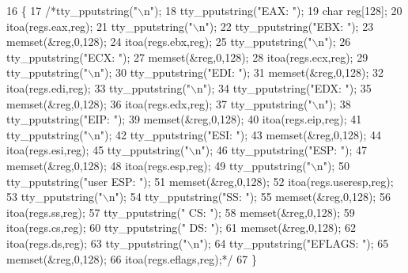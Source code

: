 \begin{DoxyCode}
16                              \{
17     \textcolor{comment}{/*tty\_pputstring("\(\backslash\)n");}
18 \textcolor{comment}{    tty\_pputstring("EAX: ");}
19 \textcolor{comment}{    char reg[128];}
20 \textcolor{comment}{    itoa(regs.eax,reg);}
21 \textcolor{comment}{    tty\_pputstring("\(\backslash\)n");}
22 \textcolor{comment}{    tty\_pputstring("EBX: ");}
23 \textcolor{comment}{    memset(&reg,0,128);}
24 \textcolor{comment}{    itoa(regs.ebx,reg);}
25 \textcolor{comment}{    tty\_pputstring("\(\backslash\)n");}
26 \textcolor{comment}{    tty\_pputstring("ECX: ");}
27 \textcolor{comment}{    memset(&reg,0,128);}
28 \textcolor{comment}{    itoa(regs.ecx,reg);}
29 \textcolor{comment}{    tty\_pputstring("\(\backslash\)n");}
30 \textcolor{comment}{    tty\_pputstring("EDI: ");}
31 \textcolor{comment}{    memset(&reg,0,128);}
32 \textcolor{comment}{    itoa(regs.edi,reg);}
33 \textcolor{comment}{    tty\_pputstring("\(\backslash\)n");}
34 \textcolor{comment}{    tty\_pputstring("EDX: ");}
35 \textcolor{comment}{    memset(&reg,0,128);}
36 \textcolor{comment}{    itoa(regs.edx,reg);}
37 \textcolor{comment}{    tty\_pputstring("\(\backslash\)n");}
38 \textcolor{comment}{    tty\_pputstring("EIP: ");}
39 \textcolor{comment}{    memset(&reg,0,128);}
40 \textcolor{comment}{    itoa(regs.eip,reg);}
41 \textcolor{comment}{    tty\_pputstring("\(\backslash\)n");}
42 \textcolor{comment}{    tty\_pputstring("ESI: ");}
43 \textcolor{comment}{    memset(&reg,0,128);}
44 \textcolor{comment}{    itoa(regs.esi,reg);}
45 \textcolor{comment}{    tty\_pputstring("\(\backslash\)n");}
46 \textcolor{comment}{    tty\_pputstring("ESP: ");}
47 \textcolor{comment}{    memset(&reg,0,128);}
48 \textcolor{comment}{    itoa(regs.esp,reg);}
49 \textcolor{comment}{    tty\_pputstring("\(\backslash\)n");}
50 \textcolor{comment}{    tty\_pputstring("user ESP: ");}
51 \textcolor{comment}{    memset(&reg,0,128);}
52 \textcolor{comment}{    itoa(regs.useresp,reg);}
53 \textcolor{comment}{    tty\_pputstring("\(\backslash\)n");}
54 \textcolor{comment}{    tty\_pputstring("SS: ");}
55 \textcolor{comment}{    memset(&reg,0,128);}
56 \textcolor{comment}{    itoa(regs.ss,reg);}
57 \textcolor{comment}{    tty\_pputstring(" CS: ");}
58 \textcolor{comment}{    memset(&reg,0,128);}
59 \textcolor{comment}{    itoa(regs.cs,reg);}
60 \textcolor{comment}{    tty\_pputstring(" DS: ");}
61 \textcolor{comment}{    memset(&reg,0,128);}
62 \textcolor{comment}{    itoa(regs.ds,reg);}
63 \textcolor{comment}{    tty\_pputstring("\(\backslash\)n");}
64 \textcolor{comment}{    tty\_pputstring("EFLAGS: ");}
65 \textcolor{comment}{    memset(&reg,0,128);}
66 \textcolor{comment}{    itoa(regs.eflags,reg);*/}
67 \}
\end{DoxyCode}
\mbox{\label{a00113_aeeac7331d1a449871656eeb6ac73fd25_aeeac7331d1a449871656eeb6ac73fd25}} 
